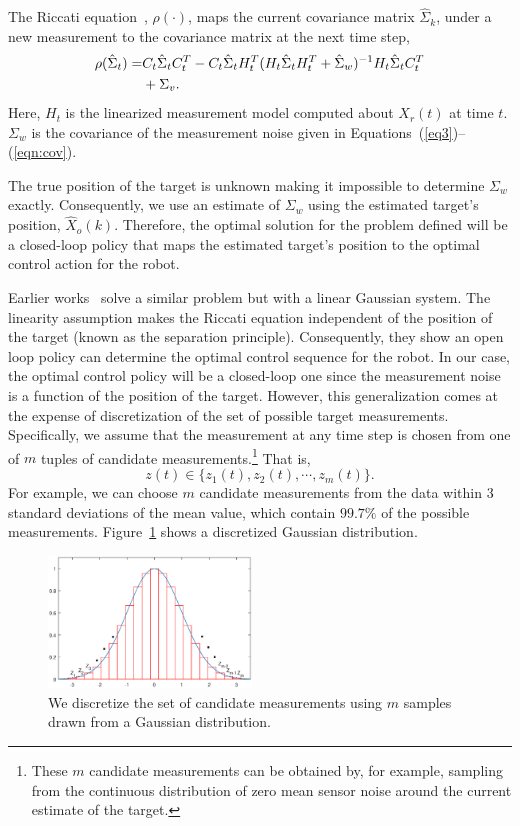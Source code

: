 \documentclass[journal]{IEEEtran}
\begin{document}
The Riccati equation~\cite{kumar1986stochastic}, $\rho(\cdot)$, maps the current covariance matrix $\hat\Sigma_k$, under a new measurement to the covariance matrix at the next time step,
\begin{align}
 \rho(\hat{\Sigma}_t)=&C_t\hat{\Sigma}_tC_t^T-C_t\hat{\Sigma}_tH_{t }^T(H_{t}\hat{\Sigma}_tH_{t}^T+\hat{\Sigma}_{w})^{-1}H_{t}\hat{\Sigma}_tC_t^T\notag\\
 &+\Sigma_v.  \label{eq6}
\end{align}
Here, $H_t$ is the linearized measurement model computed about ${X}_r(t)$ at time $t$.
$\Sigma_{w}$ is the covariance of the measurement noise given in Equations~(\ref{eq3})--(\ref{eqn:cov}). 

The true position of the target is unknown making it impossible to determine $\Sigma_{w}$ exactly. Consequently, we use an estimate of $\Sigma_{w}$ using the estimated  target's position, $\hat{X}_o(k)$. Therefore, the optimal solution for the problem defined will be a closed-loop policy that  maps the estimated target's position to the optimal control action for the robot.
%



Earlier works~\cite{vitus2012efficient, atanasov2014information} solve a similar problem but with a linear Gaussian system. The linearity assumption makes the Riccati equation independent of the position of the target (known as the separation principle). Consequently, they show an open loop policy can determine the optimal control sequence for the robot. In our case, the optimal control policy will be a closed-loop one since the measurement noise is a function of the position of the target. However, this generalization comes at the expense of discretization of the set of possible target measurements. Specifically, we assume that the measurement at any time step is chosen from one of $m$ tuples of candidate measurements.\footnote{These $m$ candidate measurements can be obtained by, for example, sampling from the continuous distribution of zero mean sensor noise around the current estimate of the target.} That is,
$$z(t) \in \{z_1(t),z_2(t),\cdots, z_m(t)\}.$$
For example, we can choose $m$ candidate measurements from the data within 3 standard deviations of the mean value, which contain $99.7\%$ of the possible measurements. Figure~\ref{c2dGuassianfig} shows a discretized Gaussian distribution. 
\begin{figure}[H]
  \centering
  \includegraphics[height=3.5cm  ]{figs/c2dGuassian.eps}
  \caption{We discretize the set of candidate measurements using $m$ samples drawn from a Gaussian distribution.}
  \label{c2dGuassianfig}
\end{figure}
\end{document}
